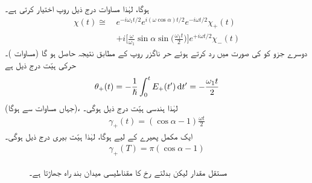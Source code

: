 ہوگا،  لہٰذا مساوات  درج ذیل روپ اختیار کرتی ہے۔ 
\begin{align}
\chi (t) \cong \,&e^{- i \omega_1 t/2} e^{i (\omega \cos \alpha) t/2} e^{- i \omega t/2} \chi_+(t) \nonumber\\
&+i \big [ \frac{\omega}{\omega_1} \sin \alpha \sin \big ( \frac{\omega_1 t}{2} \big ) \big ]e^{+ i \omega t/2} \chi_{-} (t)
\end{align}
دوسرے جزو کو   کی صورت میں رد کرتے ہوئے حر ناگزر روپ کے مطابق  نتیجہ حاصل ہو گا (مساوات  )۔ حرکی ہیّت درج ذیل ہے 
\begin{align}
\theta_+ (t) = - \frac{1}{\hslash} \int_0^t E_+ (t') \dif t' = - \frac{\omega_1 t}{2}
\end{align}
(جہاں مساوات  سے  ہوگا)،  لہٰذا ہندسی ہیّت درج ذیل ہوگی۔
\begin{align}
\gamma_+ (t) = (\cos \alpha - 1) \frac{\omega t}{2}
\end{align}
ایک مکمل پھیرے کے لیے  ہوگا،  لہٰذا ہیّت بیری درج ذیل ہوگی۔
\begin{align}\label{مساوات_حر_گاما}
\gamma_+ (T) = \pi (\cos \alpha - 1)
\end{align}

\begin{figure}
\centering
{}
\caption{مستقل  مقدار لیکن بدلتے رخ کا مقناطیسی میدان بند راہ   جھاڑتا  ہے۔}
\label{شکل_حرارت_نا_گزر_مقناطیسی_میدان_بند_راہ}
\end{figure}

